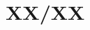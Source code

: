 \documentclass[../../rtnotes.tex]{subfiles}
\begin{document}
\section{XX/XX}
\subsection{}
\end{document}
